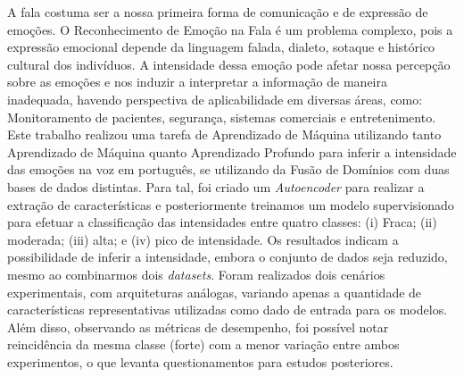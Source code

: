 A fala costuma ser a nossa primeira forma de comunicação e de expressão de emoções. O Reconhecimento de Emoção na Fala é um problema complexo, pois a expressão emocional depende da linguagem falada, dialeto, sotaque e histórico cultural dos indivíduos. A intensidade dessa emoção pode afetar nossa percepção sobre as emoções e nos induzir a interpretar a informação de maneira inadequada, havendo perspectiva de aplicabilidade em diversas áreas, como: Monitoramento de pacientes, segurança, sistemas comerciais e entretenimento. Este trabalho realizou uma tarefa de Aprendizado de Máquina utilizando tanto Aprendizado de Máquina quanto Aprendizado Profundo para inferir a intensidade das emoções na voz em português, se utilizando da Fusão de Domínios com duas bases de dados distintas. Para tal, foi criado um \textit{Autoencoder} para realizar a extração de características e posteriormente treinamos um modelo supervisionado para efetuar a classificação das intensidades entre quatro classes: (i) Fraca; (ii) moderada; (iii) alta; e (iv) pico de intensidade. Os resultados indicam a possibilidade de inferir a intensidade, embora o conjunto de dados seja reduzido, mesmo ao combinarmos dois \textit{datasets}. Foram realizados dois cenários experimentais, com arquiteturas análogas, variando apenas a quantidade de características representativas utilizadas como dado de entrada para os modelos. Além disso, observando as métricas de desempenho, foi possível notar reincidência da mesma classe (forte) com a menor variação entre ambos experimentos, o que levanta questionamentos para estudos posteriores.
